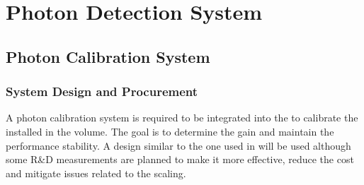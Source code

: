 \chapter{Photon Detection System}
\label{ch:fddp-pd}

\section{Photon Calibration System}
\label{sec:fddp-pd-5}

\subsection{System Design and Procurement}
\label{sec:fddp-pd-5.1}

A photon calibration system is required to be integrated into the  to calibrate the  
installed in the \lar volume. The goal is to determine the  gain and maintain the  performance stability. A design similar to the one used in  will be used although some R\&D measurements are planned to make it more effective, reduce the cost and mitigate issues related to the scaling.


